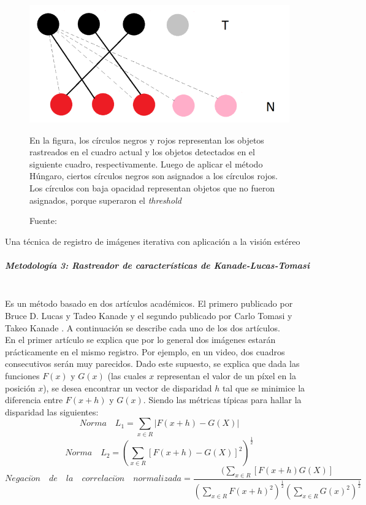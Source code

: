 \documentclass[a4paper,openright,12pt]{report}
\begin{document}
\begin{figure}[H]
  \centering
    \includegraphics[width=1.0\columnwidth]{../images/hungarian-1.png}\par
  \caption{En la figura, los círculos negros y rojos representan los objetos
    rastreados en el cuadro actual y los objetos detectados en el siguiente
    cuadro, respectivamente. Luego de aplicar el método Húngaro, ciertos
    círculos negros son asignados a los círculos rojos. Los círculos con baja
    opacidad representan objetos que no fueron asignados, porque superaron el
    \textit{threshold}}
  \caption*{Fuente: \cite{szHucs2015svm}}
  \label{fig:hungarian-diagram-1}
\end{figure}

Una técnica de registro de imágenes iterativa con
              aplicación a la visión estéreo

\subparagraph{Metodología 3: Rastreador de características de Kanade-Lucas-Tomasi}
\mbox{} \\
Es un método basado en dos artículos académicos. El primero publicado por
Bruce D. Lucas y Tadeo Kanade \cite{lucas1981iterative} y el segundo publicado
por Carlo Tomasi y Takeo Kanade \cite{tomasi1991detection}. A continuación se
describe cada uno de los dos artículos.\\
En el primer artículo se explica que por
lo general dos imágenes estarán prácticamente en el mismo registro. Por ejemplo,
en un video, dos cuadros consecutivos serán muy parecidos. Dado este supuesto,
se explica que dada las funciones $F(x)$ y $G(x)$ (las cuales $x$ representan
el valor de un píxel en la posición $x$), se desea encontrar un vector de
disparidad $h$ tal que se minimice la diferencia entre $F(x+h)$ y $G(x)$. Siendo
las métricas típicas para hallar la disparidad las siguientes:\\

$$Norma \quad L_{1} = \sum_{x\in R} |F(x+h) - G(X)|$$
$$Norma \quad L_{2} = (\sum_{x\in R} [F(x+h) - G(X)]^2)^\frac{1}{2}$$
$$Negaci\acute on\quad de \quad	la \quad correlaci\acute on \quad normalizada =
    \frac{(\sum_{x\in R} [F(x+h)G(X)]}
         {(\sum_{x\in R} F(x+h)^2)^\frac{1}{2}
          (\sum_{x\in R} G(x)^2)^\frac{1}{2}}$$
\end{document}
